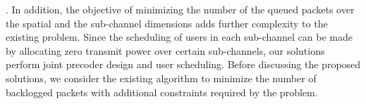 
. In addition, the objective of minimizing the number of the queued packets over the spatial and the sub-channel dimensions adds further complexity to the existing problem. Since the scheduling of users in each sub-channel can be made by allocating zero transmit power over certain sub-channels, our solutions perform joint precoder design and user scheduling. Before discussing the proposed solutions, we consider the existing algorithm to minimize the number of backlogged packets with additional constraints required by the problem.